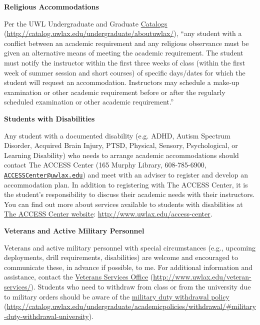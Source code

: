 \documentclass[10pt]{article}
\newcommand{\bulurl}[1]{\url{#1}}
\newcommand{\toprule}{\par\vspace*{5pt}\noindent{\hrule\hfill}\par\vspace*{1pt}}
\newcommand{\botrule}{\par\noindent{\hrule\hfill}\par}
\begin{document}
\botrule \textbf{Religious Accommodations} \toprule
Per the UWL Undergraduate and Graduate \href{http://catalog.uwlax.edu/undergraduate/aboutuwlax/}{Catalogs} (\bulurl{http://catalog.uwlax.edu/undergraduate/aboutuwlax/}), ``any student with a conflict between an academic requirement and any religious observance must be given an alternative means of meeting the academic requirement. The student must notify the instructor within the first three weeks of class (within the first week of summer session and short courses) of specific days/dates for which the student will request an accommodation. Instructors may schedule a make-up examination or other academic requirement before or after the regularly scheduled examination or other academic requirement.''\\

\botrule \textbf{Students with Disabilities} \toprule
Any student with a documented disability (e.g. ADHD, Autism Spectrum Disorder, Acquired Brain Injury, PTSD, Physical, Sensory, Psychological, or Learning Disability) who needs to arrange academic accommodations should contact The ACCESS Center (165 Murphy Library, 608-785-6900, \texttt{\href{mailto:ACCESSCenter@uwlax.edu}{ACCESSCenter@uwlax.edu}}) and meet with an adviser to register and develop an accommodation plan.  In addition to registering with The ACCESS Center, it is the student's responsibility to discuss their academic needs with their instructors.  You can find out more about services available to students with disabilities at \href{http://www.uwlax.edu/access-center}{The ACCESS Center website}: \bulurl{http://www.uwlax.edu/access-center}.\\

\botrule \textbf{Veterans and Active Military Personnel} \toprule
Veterans and active military personnel with special circumstances (e.g., upcoming deployments, drill requirements, disabilities) are welcome and encouraged to communicate these, in advance if possible, to me. For additional information and assistance, contact the \href{http://www.uwlax.edu/veteran-services/}{Veterans Services Office} (\bulurl{http://www.uwlax.edu/veteran-services/}). Students who need to withdraw from class or from the university due to military orders should be aware of the \href{http://catalog.uwlax.edu/undergraduate/academicpolicies/withdrawal/\#military-duty-withdrawal-university}{military duty withdrawal policy} (\bulurl{http://catalog.uwlax.edu/undergraduate/academicpolicies/withdrawal/\#military-duty-withdrawal-university}).\\
\end{document}
